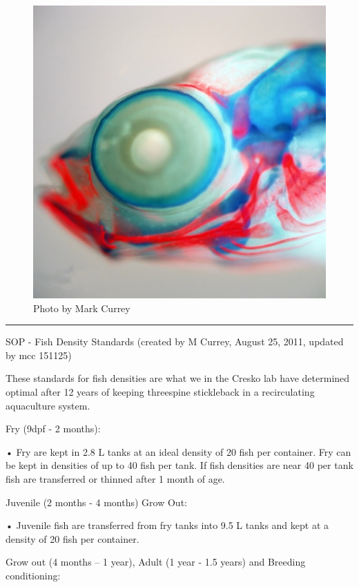 \documentclass[
]{book}
\begin{document}
\begin{figure}
\centering
\includegraphics{images/double_head.jpg}
\caption{Photo by Mark Currey}
\end{figure}

\begin{center}\rule{0.5\linewidth}{0.5pt}\end{center}

SOP - Fish Density Standards
(created by M Currey, August 25, 2011, updated by mcc 151125)

These standards for fish densities are what we in the Cresko lab have determined optimal after 12 years of keeping threespine stickleback in a recirculating aquaculture system.

Fry (9dpf - 2 months):

• Fry are kept in 2.8 L tanks at an ideal density of 20 fish per container. Fry can be kept in densities of up to 40 fish per tank. If fish densities are near 40 per tank fish are transferred or thinned after 1 month of age.

Juvenile (2 months - 4 months) Grow Out:

• Juvenile fish are transferred from fry tanks into 9.5 L tanks and kept at a density of 20 fish per container.

Grow out (4 months -- 1 year), Adult (1 year - 1.5 years) and Breeding conditioning:
\end{document}
